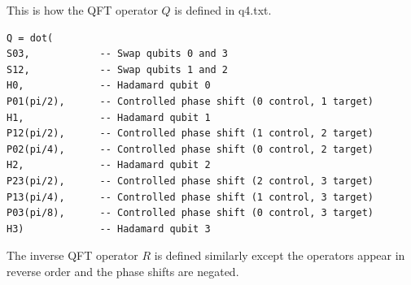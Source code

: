 \documentclass[12pt]{article}
\begin{document}
\noindent
This is how the QFT operator $Q$ is defined in q4.txt.

\begin{verbatim}
Q = dot(
S03,            -- Swap qubits 0 and 3
S12,            -- Swap qubits 1 and 2
H0,             -- Hadamard qubit 0
P01(pi/2),      -- Controlled phase shift (0 control, 1 target)
H1,             -- Hadamard qubit 1
P12(pi/2),      -- Controlled phase shift (1 control, 2 target)
P02(pi/4),      -- Controlled phase shift (0 control, 2 target)
H2,             -- Hadamard qubit 2
P23(pi/2),      -- Controlled phase shift (2 control, 3 target)
P13(pi/4),      -- Controlled phase shift (1 control, 3 target)
P03(pi/8),      -- Controlled phase shift (0 control, 3 target)
H3)             -- Hadamard qubit 3
\end{verbatim}

\noindent
The inverse QFT operator $R$ is defined similarly except the operators appear in reverse order
and the phase shifts are negated.
\end{document}
